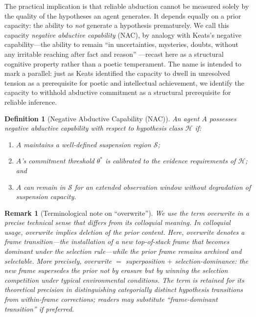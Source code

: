 \documentclass[12pt]{article}
\newtheorem{definition}{Definition}
\newtheorem{remark}{Remark}
\begin{document}
The practical implication is that reliable abduction cannot be measured
solely by the quality of the hypotheses an agent generates.
It depends equally on a prior capacity: the ability to \emph{not} generate
a hypothesis prematurely.
We call this capacity \emph{negative abductive capability} (NAC),
by analogy with Keats's negative capability---the ability to remain
``in uncertainties, mysteries, doubts, without any irritable reaching
after fact and reason'' \cite{keats1817}---recast here as a structural
cognitive property rather than a poetic temperament.
The name is intended to mark a parallel: just as Keats identified the
capacity to dwell in unresolved tension as a prerequisite for poetic
and intellectual achievement, we identify the capacity to withhold
abductive commitment as a structural prerequisite for reliable inference.

\begin{definition}[Negative Abductive Capability (NAC)]
\label{def:nac}
An agent $A$ possesses negative abductive capability with respect to
hypothesis class $\mathcal{H}$ if:
\begin{enumerate}
  \item $A$ maintains a well-defined suspension region $\mathcal{S}$;
  \item $A$'s commitment threshold $\theta^*$ is calibrated to the
        evidence requirements of $\mathcal{H}$; and
  \item $A$ can remain in $\mathcal{S}$ for an extended observation
        window without degradation of suspension capacity.
\end{enumerate}
\end{definition}

\begin{remark}[Terminological note on ``overwrite'']
We use the term \emph{overwrite} in a precise technical sense that
differs from its colloquial meaning.
In colloquial usage, overwrite implies deletion of the prior content.
Here, overwrite denotes a \emph{frame transition}---the installation
of a new top-of-stack frame that becomes dominant under the selection
rule---while the prior frame remains archived and selectable.
More precisely, overwrite $=$ superposition $+$ selection-dominance:
the new frame supersedes the prior not by erasure but by winning the
selection competition under typical environmental conditions.
The term is retained for its theoretical precision in distinguishing
categorially distinct hypothesis transitions from within-frame corrections;
readers may substitute ``frame-dominant transition'' if preferred.
\end{remark}
\end{document}
